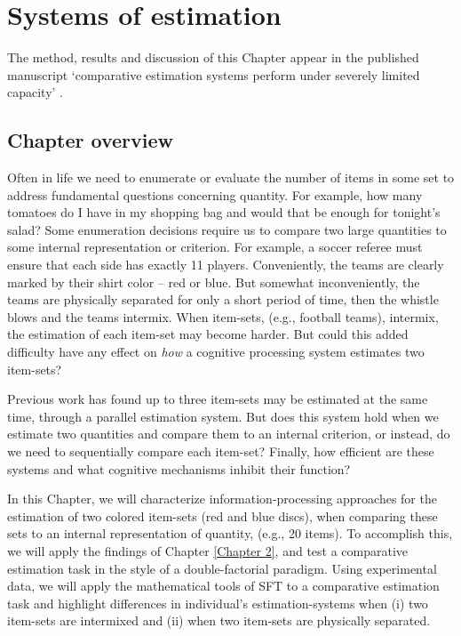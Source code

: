 \chapter{Systems of estimation} 

\label{Chapter 3}

\vspace{3cm}
\newpage


\noindent
The method, results and discussion of this Chapter appear in the published manuscript `comparative estimation systems perform under severely limited capacity' \cite{garrett2019comparative}.

\section{Chapter overview}
Often in life we need to enumerate or evaluate the number of items in some set to address fundamental questions concerning quantity. For example, how many tomatoes do I have in my shopping bag and would that be enough for tonight's salad? Some enumeration decisions require us to compare two large quantities to some internal representation or criterion. For example, a soccer referee must ensure that each side has exactly 11 players. Conveniently, the teams are clearly marked by their shirt color -- red or blue. But somewhat inconveniently, the teams are physically separated for only a short period of time, then the whistle blows and the teams intermix. When item-sets, (e.g., football teams), intermix, the estimation of each item-set may become harder. But could this added difficulty have any effect on \emph{how} a cognitive processing system estimates two item-sets? 

Previous work \cite{HALBERDA_2006} has found up to three item-sets may be estimated at the same time, through a parallel estimation system. But does this system hold when we estimate two quantities and compare them to an internal criterion, or instead, do we need to sequentially compare each item-set? Finally, how efficient are these systems and what cognitive mechanisms inhibit their function?

In this Chapter, we will characterize information-processing approaches for the estimation of two colored item-sets (red and blue discs), when comparing these sets to an internal representation of quantity, (e.g., 20 items). To accomplish this, we will apply the findings of Chapter \ref{Chapter 2}, and test a comparative estimation task in the style of a double-factorial paradigm. Using experimental data, we will apply the mathematical tools of SFT to a comparative estimation task and highlight differences in individual's estimation-systems when (i) two item-sets are intermixed and (ii) when two item-sets are physically separated. 

